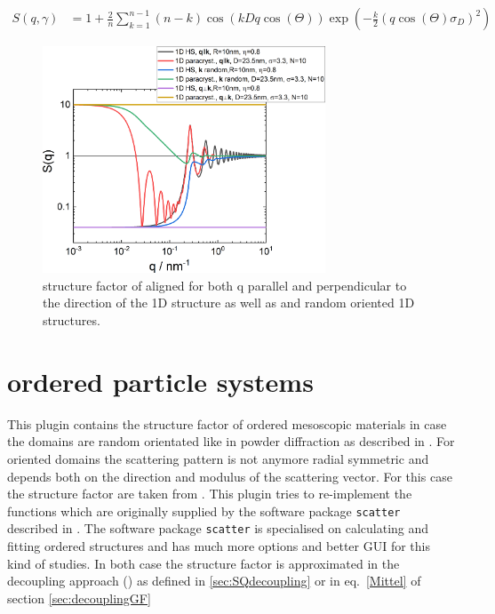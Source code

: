 \begin{align}\label{eq:SQ1D_paracrystal}
  S(q,\gamma) &=  1+\frac{2}{n} \sum_{k=1}^{n-1} (n-k)
\cos(kDq\cos(\Theta))
     \exp\left(-\frac{k}{2}\left(q\cos(\Theta) \sigma_D\right)^2\right)
\end{align}

\begin{figure}[htb]
\begin{center}
\includegraphics[width=0.75\textwidth]{../images/structure_factor/SQ_1D_2D/SQ_1D.png}
\end{center}
\caption{structure factor of aligned for both q parallel and perpendicular to the direction of the 1D structure as well as and random oriented 1D structures.}
\label{fig:1DSQ}
\end{figure}


\clearpage
\section{ordered particle systems} \hspace{1pt}
\label{sec:ops}
This plugin contains the structure factor of ordered mesoscopic materials in case the domains are random orientated like in powder diffraction as described in \cite{Forster2005}. For oriented domains the scattering pattern is not anymore radial symmetric and depends both on the direction and modulus of the scattering vector. For this case the structure factor are taken from  \cite{Forster2011}. This plugin tries to re-implement the functions which are originally supplied by the software package \texttt{scatter} described in \cite{Forster2010}. The software package \texttt{scatter} is specialised on calculating and fitting ordered structures and has much more options and better GUI for this kind of studies. In both case the structure factor is approximated in the decoupling approach (\cite{Kotlarchyk1983}) as defined in \ref{sec:SQdecoupling} or in eq.\ \ref{Mittel} of section \ref{sec:decouplingGF}

